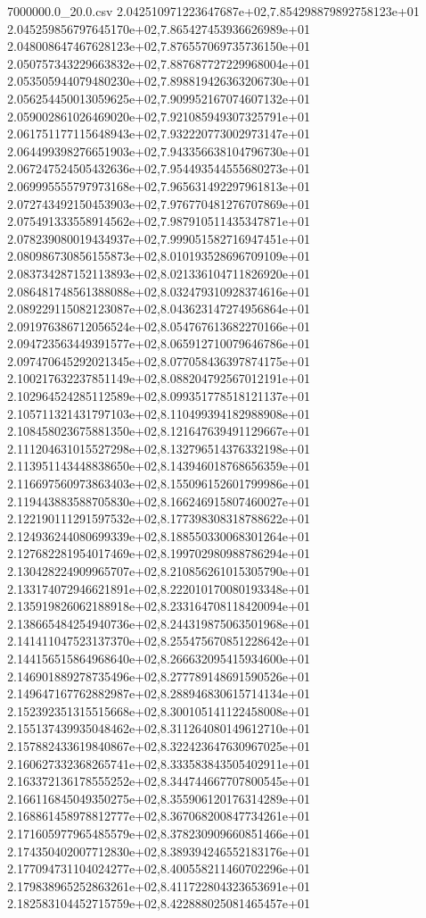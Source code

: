 \begin{filecontents*}{7000000.0_20.0.csv}
2.042510971223647687e+02,7.854298879892758123e+01
2.045259856797645170e+02,7.865427453936626989e+01
2.048008647467628123e+02,7.876557069735736150e+01
2.050757343229663832e+02,7.887687727229968004e+01
2.053505944079480230e+02,7.898819426363206730e+01
2.056254450013059625e+02,7.909952167074607132e+01
2.059002861026469020e+02,7.921085949307325791e+01
2.061751177115648943e+02,7.932220773002973147e+01
2.064499398276651903e+02,7.943356638104796730e+01
2.067247524505432636e+02,7.954493544555680273e+01
2.069995555797973168e+02,7.965631492297961813e+01
2.072743492150453903e+02,7.976770481276707869e+01
2.075491333558914562e+02,7.987910511435347871e+01
2.078239080019434937e+02,7.999051582716947451e+01
2.080986730856155873e+02,8.010193528696709109e+01
2.083734287152113893e+02,8.021336104711826920e+01
2.086481748561388088e+02,8.032479310928374616e+01
2.089229115082123087e+02,8.043623147274956864e+01
2.091976386712056524e+02,8.054767613682270166e+01
2.094723563449391577e+02,8.065912710079646786e+01
2.097470645292021345e+02,8.077058436397874175e+01
2.100217632237851149e+02,8.088204792567012191e+01
2.102964524285112589e+02,8.099351778518121137e+01
2.105711321431797103e+02,8.110499394182988908e+01
2.108458023675881350e+02,8.121647639491129667e+01
2.111204631015527298e+02,8.132796514376332198e+01
2.113951143448838650e+02,8.143946018768656359e+01
2.116697560973863403e+02,8.155096152601799986e+01
2.119443883588705830e+02,8.166246915807460027e+01
2.122190111291597532e+02,8.177398308318788622e+01
2.124936244080699339e+02,8.188550330068301264e+01
2.127682281954017469e+02,8.199702980988786294e+01
2.130428224909965707e+02,8.210856261015305790e+01
2.133174072946621891e+02,8.222010170080193348e+01
2.135919826062188918e+02,8.233164708118420094e+01
2.138665484254940736e+02,8.244319875063501968e+01
2.141411047523137370e+02,8.255475670851228642e+01
2.144156515864968640e+02,8.266632095415934600e+01
2.146901889278735496e+02,8.277789148691590526e+01
2.149647167762882987e+02,8.288946830615714134e+01
2.152392351315515668e+02,8.300105141122458008e+01
2.155137439935048462e+02,8.311264080149612710e+01
2.157882433619840867e+02,8.322423647630967025e+01
2.160627332368265741e+02,8.333583843505402911e+01
2.163372136178555252e+02,8.344744667707800545e+01
2.166116845049350275e+02,8.355906120176314289e+01
2.168861458978812777e+02,8.367068200847734261e+01
2.171605977965485579e+02,8.378230909660851466e+01
2.174350402007712830e+02,8.389394246552183176e+01
2.177094731104024277e+02,8.400558211460702296e+01
2.179838965252863261e+02,8.411722804323653691e+01
2.182583104452715759e+02,8.422888025081465457e+01

\end{filecontents*}
